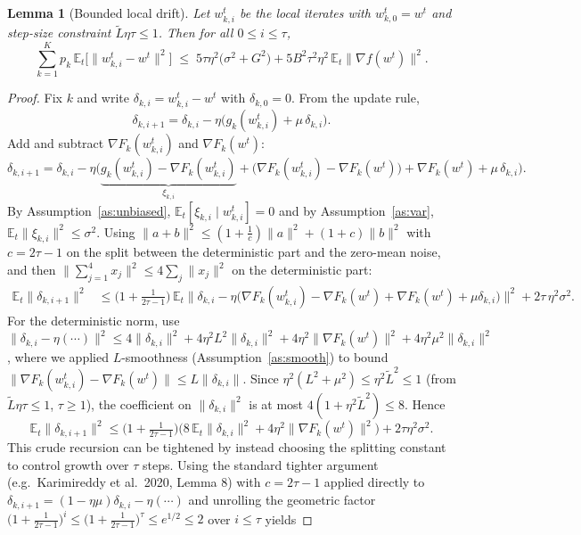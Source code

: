 \documentclass{article}
\newtheorem{lemma}{Lemma}
\begin{document}
\begin{lemma}[Bounded local drift]\label{lem:drift}
Let $w_{k,i}^t$ be the local iterates with $w_{k,0}^t = w^t$ and step-size constraint $\tilde L \eta \tau \le 1$. Then for all $0 \le i \le \tau$,
\[
\sum_{k=1}^K p_k \,\mathbb{E}_t\big[\|w_{k,i}^t - w^t\|^2\big]
\;\le\; 5\tau \eta^2 \big(\sigma^2 + G^2\big) + 5 B^2 \tau^2 \eta^2 \,\mathbb{E}_t\|\nabla f(w^t)\|^2 .
\]
\end{lemma}

\begin{proof}
Fix $k$ and write $\delta_{k,i} = w_{k,i}^t - w^t$ with $\delta_{k,0}=0$. From the update rule,
\[
\delta_{k,i+1} = \delta_{k,i} - \eta\big(g_k(w_{k,i}^t) + \mu\,\delta_{k,i}\big).
\]
Add and subtract $\nabla F_k(w_{k,i}^t)$ and $\nabla F_k(w^t)$:
\[
\delta_{k,i+1} = \delta_{k,i} - \eta\Big(\underbrace{g_k(w_{k,i}^t)-\nabla F_k(w_{k,i}^t)}_{\xi_{k,i}}
+ \big(\nabla F_k(w_{k,i}^t)-\nabla F_k(w^t)\big) + \nabla F_k(w^t) + \mu\,\delta_{k,i}\Big).
\]
By Assumption~\ref{as:unbiased}, $\mathbb{E}_t[\xi_{k,i}\mid w_{k,i}^t]=0$ and by Assumption~\ref{as:var}, $\mathbb{E}_t\|\xi_{k,i}\|^2 \le \sigma^2$. Using $\|a+b\|^2 \le (1+\tfrac{1}{c})\|a\|^2 + (1+c)\|b\|^2$ with $c = 2\tau-1$ on the split between the deterministic part and the zero-mean noise, and then $\|\sum_{j=1}^4 x_j\|^2 \le 4\sum_j\|x_j\|^2$ on the deterministic part:
\begin{align*}
\mathbb{E}_t\|\delta_{k,i+1}\|^2
&\le \Big(1+\tfrac{1}{2\tau-1}\Big)\,\mathbb{E}_t\big\|\delta_{k,i} - \eta\big(\nabla F_k(w_{k,i}^t)-\nabla F_k(w^t)+\nabla F_k(w^t)+\mu\delta_{k,i}\big)\big\|^2
+ 2\tau\,\eta^2\sigma^2.
\end{align*}
For the deterministic norm, use $\|\delta_{k,i}-\eta(\cdots)\|^2 \le 4\|\delta_{k,i}\|^2 + 4\eta^2 L^2\|\delta_{k,i}\|^2 + 4\eta^2\|\nabla F_k(w^t)\|^2 + 4\eta^2\mu^2\|\delta_{k,i}\|^2$, where we applied $L$-smoothness (Assumption~\ref{as:smooth}) to bound $\|\nabla F_k(w_{k,i}^t)-\nabla F_k(w^t)\| \le L\|\delta_{k,i}\|$. Since $\eta^2(L^2+\mu^2) \le \eta^2\tilde L^2 \le 1$ (from $\tilde L\eta\tau\le1$, $\tau\ge1$), the coefficient on $\|\delta_{k,i}\|^2$ is at most $4(1+ \eta^2\tilde L^2) \le 8$. Hence
\[
\mathbb{E}_t\|\delta_{k,i+1}\|^2 \le \Big(1+\tfrac{1}{2\tau-1}\Big)\Big(8\,\mathbb{E}_t\|\delta_{k,i}\|^2 + 4\eta^2\|\nabla F_k(w^t)\|^2\Big) + 2\tau\eta^2\sigma^2 .
\]
This crude recursion can be tightened by instead choosing the splitting constant to control growth over $\tau$ steps. Using the standard tighter argument (e.g.\ Karimireddy et al.\ 2020, Lemma 8) with $c=2\tau-1$ applied directly to $\delta_{k,i+1}=(1-\eta\mu)\delta_{k,i}-\eta(\cdots)$ and unrolling the geometric factor $\big(1+\tfrac{1}{2\tau-1}\big)^{i}\le \big(1+\tfrac{1}{2\tau-1}\big)^{\tau}\le e^{1/2}\le 2$ over $i\le\tau$ yields

\end{proof}
\end{document}
